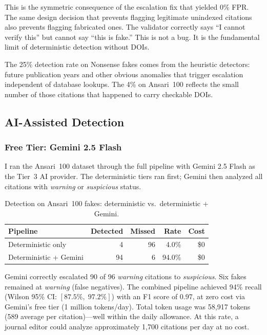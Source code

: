 This is the symmetric consequence of the escalation fix that yielded 0\% FPR. The same design decision that prevents flagging legitimate unindexed citations also prevents flagging fabricated ones. The validator correctly says ``I cannot verify this'' but cannot say ``this is fake.'' This is not a bug. It is the fundamental limit of deterministic detection without DOIs.

The 25\% detection rate on Nonsense fakes comes from the heuristic detectors: future publication years and other obvious anomalies that trigger escalation independent of database lookups. The 4\% on Ansari~100 reflects the small number of those citations that happened to carry checkable DOIs.

\subsection{AI-Assisted Detection}

\subsubsection{Free Tier: Gemini 2.5 Flash}

I ran the Ansari~100 dataset through the full pipeline with Gemini 2.5 Flash as the Tier~3 AI provider. The deterministic tiers ran first; Gemini then analyzed all citations with \textit{warning} or \textit{suspicious} status.

\begin{table}[H]
\centering
\caption{Detection on Ansari~100 fakes: deterministic vs.\ deterministic + Gemini.}
\label{tab:gemini-fakes}
\begin{tabular}{@{}lrrrr@{}}
\toprule
\textbf{Pipeline} & \textbf{Detected} & \textbf{Missed} & \textbf{Rate} & \textbf{Cost} \\
\midrule
Deterministic only         &   4 & 96 &  4.0\% & \$0 \\
Deterministic + Gemini     &  94 &  6 & 94.0\% & \$0 \\
\bottomrule
\end{tabular}
\end{table}

Gemini correctly escalated 90 of 96 \textit{warning} citations to \textit{suspicious}. Six fakes remained at \textit{warning} (false negatives). The combined pipeline achieved 94\% recall (Wilson 95\% CI: $[87.5\%,\;97.2\%]$) with an F1 score of 0.97, at zero cost via Gemini's free tier (1 million tokens/day). Total token usage was 58{,}917 tokens (589 average per citation)---well within the daily allowance. At this rate, a journal editor could analyze approximately 1{,}700 citations per day at no cost.

